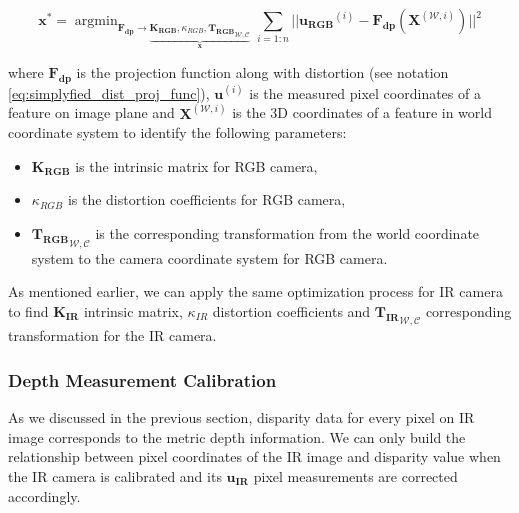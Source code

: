 \documentclass[a4paper]{report}
\numberwithin{figure}{section}
\newcommand{\argmin}{\mathop{\mathrm{argmin}}}
\begin{document}
\begin{equation}\label{eq:proj_lsq}
  \mathbf{x^*}
  = 
  \argmin_{\mathbf{F_{dp}} \rightarrow 
  	\underbrace{
  		\mathbf{K_{RGB}}, 
  \kappa_{RGB}, 
  {\mathbf{T_{RGB}}}_{\mathcal{W}, \mathcal{C}}
  }_{\mathbf{x}}
  }
  \sum_{i=1:n} || \mathbf{u_{RGB}}^{(i)} - 
  \mathbf{F_{dp}} (\mathbf{X}^{(\mathcal{W}, i)}) ||^2
\end{equation}

where $\mathbf{F_{dp}}$ is the projection function along with distortion (see 
notation \eqref{eq:simplyfied_dist_proj_func}), $\mathbf{u}^{(i)}$ is the 
measured pixel coordinates of a feature on image plane and 
$\mathbf{X}^{(\mathcal{W},i)}$ is the 3D coordinates of a feature in world 
coordinate 
system to identify the following parameters:

\begin{itemize}
  \item $\mathbf{K_{RGB}}$ is the intrinsic matrix for RGB camera, 
  \item $\kappa_{RGB}$ is the distortion coefficients for RGB camera, 
  \item ${\mathbf{T_{RGB}}}_{\mathcal{W}, \mathcal{C}}$ is the corresponding 
  transformation from the world coordinate system to the camera coordinate 
  system for RGB camera.
\end{itemize}

As mentioned earlier, we can apply the same optimization process for IR camera 
to find $\mathbf{K_{IR}}$ intrinsic matrix, $\kappa_{IR}$ 
distortion coefficients and ${\mathbf{T_{IR}}}_{\mathcal{W}, 
	\mathcal{C}}$ corresponding transformation for the IR camera.


\subsubsection{Depth Measurement Calibration}

As we discussed in the previous section, disparity data for every pixel on IR 
image corresponds to the metric depth information.  We can only build the 
relationship between pixel coordinates of the IR image and disparity value 
when the IR camera is calibrated and its $\mathbf{u_{IR}}$ pixel measurements 
are corrected accordingly.
\end{document}
